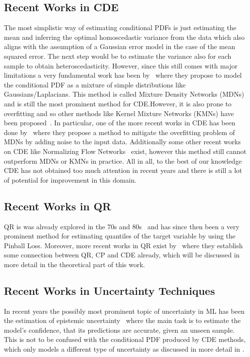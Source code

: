 \subsection{Recent Works in CDE}

The most simplistic way of estimating conditional PDFs is just estimating the mean and inferring the optimal homoscedastic variance from the data which also aligns with the assumption of a Gaussian error model in the case of the mean squared error. The next step would be to estimate the variance also for each sample to obtain heteroscedasticity. However, since this still comes with major limitations a very fundamental work has been by~\cite{bishop1994mixture} where they propose to model the conditional PDF as a mixture of simple distributions like Gaussians/Laplacians. This method is called Mixture Density Networks (MDNs) and is still the most prominent method for CDE.\@ However, it is also prone to overfitting and so other methods like Kernel Mixture Networks (KMNs) have been proposed~\cite{ambrogioni2017kernel}. In particular, one of the more recent works in CDE has been done by~\cite{rothfuss2019noise} where they propose a method to mitigate the overfitting problem of MDNs by adding noise to the input data. Additionally some other recent works on CDE like Normalizing Flow Networks~\cite{trippe2018conditional} exist, however this method still cannot outperform MDNs or KMNs in practice. All in all, to the best of our knowledge CDE has not obtained too much attention in recent years and there is still a lot of potential for improvement in this domain.

\subsection{Recent Works in QR}

QR is was already explored in the 70s and 80s~\cite{koenker1978regression} and has since then been a very prominent method for estimating quantiles of the target variable by using the Pinball Loss. Moreover, more recent works in QR exist by~\cite{chung2020beyond} where they establish some connection between QR, CP and CDE already, which will be discussed in more detail in the theoretical part of this work.

\subsection{Recent Works in Uncertainty Techniques}

In recent years the possibly most prominent topic of uncertainty in ML has been the estimation of epistemic uncertainty~\cite{barber1998ensemble, neal2012bayesian, gal_dropout_2016,schweighofer2023quantification, gawlikowski2023survey} where the main task is to estimate the model's confidence, that its predictions are accurate, given an unseen sample. This is not to be confused with the conditional PDF produced by CDE methods, which only models a different type of uncertainty as discussed in more detail in .

